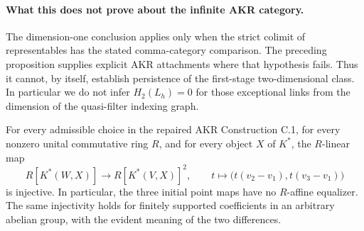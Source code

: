 \paragraph{What this does not prove about the infinite AKR category.}
The dimension-one conclusion applies only when the strict colimit of
representables has the stated comma-category comparison. The preceding
proposition supplies explicit AKR attachments where that hypothesis
fails. Thus it cannot, by itself, establish persistence of the
first-stage two-dimensional class. In particular we do not infer
$H_2(L_h)=0$ for those exceptional links from the dimension of the
quasi-filter indexing graph.

\begin{proposition}\label{C:akr-all-rings}
For every admissible choice in the repaired AKR Construction C.1, for
every nonzero unital commutative ring $R$, and for every object $X$ of
$K^*$, the $R$-linear map
\[
 R[K^*(W,X)]\longrightarrow R[K^*(V,X)]^2,\qquad
 t\longmapsto\bigl(t(v_2-v_1),t(v_3-v_1)\bigr)
\]
is injective. In particular, the three initial point maps have no
$R$-affine equalizer. The same injectivity holds for finitely supported
coefficients in an arbitrary abelian group, with the evident meaning
of the two differences.
\end{proposition}
